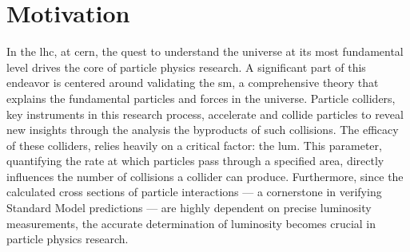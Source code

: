 \section{Motivation}


In the \acrfull{lhc}, at \acrshort{cern}, the quest to understand the universe at its most fundamental level drives the core
of particle physics research. A significant part of this endeavor is centered around validating the \acrfull{sm}, a comprehensive
theory that explains the fundamental particles and forces in the universe. Particle colliders, key instruments in this research
process, accelerate and collide particles to reveal new insights through the analysis the byproducts of such collisions. The efficacy
of these colliders, relies heavily on a critical factor: the \acrfull{lum}. This parameter, quantifying the rate at which particles pass
through a specified area, directly influences the number of collisions a collider can produce. Furthermore, since the calculated cross
sections of particle interactions — a cornerstone in verifying Standard Model predictions — are highly dependent on precise luminosity
measurements, the accurate determination of luminosity becomes crucial in particle physics research.
